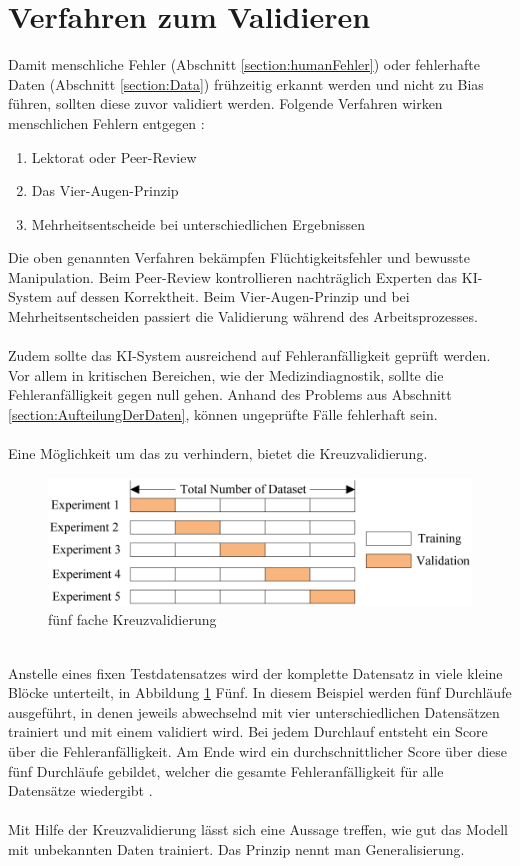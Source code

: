 \documentclass[12pt,oneside,a4paper,parskip]{scrbook}
\begin{document}
\section{Verfahren zum Validieren}
\label{section:validate}

Damit menschliche Fehler (Abschnitt \ref{section:humanFehler}) oder fehlerhafte Daten (Abschnitt \ref{section:Data}) frühzeitig erkannt werden und nicht zu Bias führen, sollten diese zuvor validiert werden. Folgende Verfahren wirken menschlichen Fehlern entgegen \cite{trainingsDataKI}:
\begin{enumerate}
	\item Lektorat oder Peer-Review
	\item Das Vier-Augen-Prinzip
	\item Mehrheitsentscheide bei unterschiedlichen Ergebnissen
\end{enumerate}
Die oben genannten Verfahren bekämpfen Flüchtigkeitsfehler und bewusste Manipulation. Beim Peer-Review kontrollieren nachträglich Experten das KI-System auf dessen Korrektheit. Beim Vier-Augen-Prinzip und bei Mehrheitsentscheiden passiert die Validierung während des Arbeitsprozesses.
\\\\
Zudem sollte das KI-System ausreichend auf Fehleranfälligkeit geprüft werden. Vor allem in kritischen Bereichen, wie der Medizindiagnostik, sollte die Fehleranfälligkeit gegen null gehen. Anhand des Problems aus Abschnitt \ref{section:AufteilungDerDaten}, können ungeprüfte Fälle fehlerhaft sein.
\\\\
Eine Möglichkeit um das zu verhindern, bietet die Kreuzvalidierung.
\begin{figure}[h]
	\begin{center}
		\includegraphics[width=15cm]{Bilder/crossValidierung.png}
		\caption{fünf fache Kreuzvalidierung}
		\label{fig:crossValidierung}
	\end{center}
\end{figure}
\\
Anstelle eines fixen Testdatensatzes wird der komplette Datensatz in viele kleine Blöcke unterteilt, in Abbildung \ref{fig:crossValidierung} Fünf. In diesem Beispiel werden fünf Durchläufe ausgeführt, in denen jeweils abwechselnd mit vier unterschiedlichen Datensätzen trainiert und mit einem validiert wird. Bei jedem Durchlauf entsteht ein Score über die Fehleranfälligkeit. Am Ende wird ein durchschnittlicher Score über diese fünf Durchläufe gebildet, welcher die gesamte Fehleranfälligkeit für alle Datensätze wiedergibt \cite{towardData}.
\\\\
Mit Hilfe der Kreuzvalidierung lässt sich eine Aussage treffen, wie gut das Modell mit unbekannten Daten trainiert. Das Prinzip nennt man Generalisierung.
\end{document}
